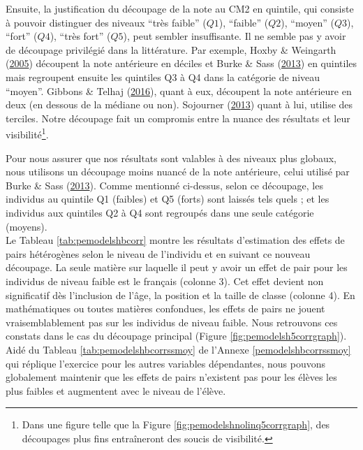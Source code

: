 \documentclass[
]{book}
\begin{document}
\quad Ensuite, la justification du découpage de la note au CM2 en quintile, qui consiste à pouvoir distinguer des niveaux ``très faible'' (\(Q1\)), ``faible'' (\(Q2\)), ``moyen'' (\(Q3\)), ``fort'' (\(Q4\)), ``très fort'' (\(Q5\)), peut sembler insuffisante. Il ne semble pas y avoir de découpage privilégié dans la littérature. Par exemple, Hoxby \& Weingarth (\protect\hyperlink{ref-HOX:WEI:05}{2005}) découpent la note antérieure en déciles et Burke \& Sass (\protect\hyperlink{ref-BUR:SAS:13}{2013}) en quintiles mais regroupent ensuite les quintiles Q3 à Q4 dans la catégorie de niveau ``moyen''. Gibbons \& Telhaj (\protect\hyperlink{ref-GIB:TEL:16}{2016}), quant à eux, découpent la note antérieure en deux (en dessous de la médiane ou non). Sojourner (\protect\hyperlink{ref-SOJ:13}{2013}) quant à lui, utilise des terciles.
Notre découpage fait un compromis entre la nuance des résultats et leur visibilité\footnote{Dans une figure telle que la Figure \ref{fig:pemodelshnolinq5corrgraph}, des découpages plus fins entraîneront des soucis de visibilité.}.

\quad Pour nous assurer que nos résultats sont valables à des niveaux plus globaux, nous utilisons un découpage moins nuancé de la note antérieure, celui utilisé par Burke \& Sass (\protect\hyperlink{ref-BUR:SAS:13}{2013}). Comme mentionné ci-dessus, selon ce découpage, les individus au quintile Q1 (faibles) et Q5 (forts) sont laissés tels quels ; et les individus aux quintiles Q2 à Q4 sont regroupés dans une seule catégorie (moyens).\\
Le Tableau \ref{tab:pemodelshbcorr} montre les résultats d'estimation des effets de pairs hétérogènes selon le niveau de l'individu et en suivant ce nouveau découpage. La seule matière sur laquelle il peut y avoir un effet de pair pour les individus de niveau faible est le français (colonne 3). Cet effet devient non significatif dès l'inclusion de l'âge, la position et la taille de classe (colonne 4). En mathématiques ou toutes matières confondues, les effets de pairs ne jouent vraisemblablement pas sur les individus de niveau faible. Nous retrouvons ces constats dans le cas du découpage principal (Figure \ref{fig:pemodelsh5corrgraph}). Aidé du Tableau \ref{tab:pemodelshbcorrssmoy} de l'Annexe \ref{pemodelshbcorrssmoy} qui réplique l'exercice pour les autres variables dépendantes, nous pouvons globalement maintenir que les effets de pairs n'existent pas pour les élèves les plus faibles et augmentent avec le niveau de l'élève.
\end{document}
